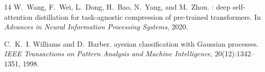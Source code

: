 \documentclass{article}
\begin{document}
\begin{thebibliography}{14}
W.~Wang, F.~Wei, L.~Dong, H.~Bao, N.~Yang, and M.~Zhou.
: deep self-attention distillation for task-agnostic compression of pre-trained transformers.
\newblock In \emph{Advances in Neural Information Processing Systems}, 2020.

C.~K.~I. Williams and D.~Barber.
ayesian classification with {G}aussian processes.
\newblock \emph{IEEE Transactions on Pattern Analysis and Machine Intelligence}, 20(12):1342--1351, 1998.

\end{thebibliography}
\end{document}
